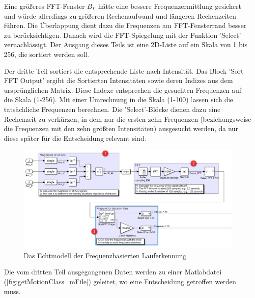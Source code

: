 Eine größeres FFT-Fenster $B_L$ hätte eine bessere Frequenzermittlung gesichert und würde allerdings zu größeren Rechenaufwand und längeren Rechenzeiten führen. Die Überlappung dient dazu die Frequenzen am FFT-Fensterrand besser zu berücksichtigen. Danach wird die FFT-Spiegelung mit der Funktion 'Select' vernachlässigt. Der Ausgang dieses Teils ist eine 2D-Liste auf ein Skala von 1 bis 256, die sortiert werden soll.

Der dritte Teil sortiert die entsprechende Liste nach Intensität. Das Block 'Sort FFT Output' ergibt die Sortierten Intensitäten sowie deren Indizes aus dem ursprünglichen Matrix. Diese Indexe entsprechen die gesuchten Frequenzen auf die Skala (1-256). Mit einer Umrechnung in die Skala (1-100) lassen sich die tatsächliche Frequenzen berechnen. Die 'Select'-Blöcke dienen dazu eine Rechenzeit zu verkürzen, in dem nur die ersten zehn Frequenzen (beziehungsweise die Frequenzen mit den zehn größten Intensitäten) ausgesucht werden, da nur diese später für die Entscheidung relevant sind.

\begin{figure}[H]
	\centering
	\includegraphics[width=\linewidth]{Bilder/Lauferkennung_Modell_1_1.png}
	\caption{Das Echtmodell der Frequenzbasierten Lauferkennung}
	\label{fig:Lauferkennung_Freqbasiert_FFT_Echtmodell}
\end{figure}

Die vom dritten Teil ausgegangenen Daten werden zu einer Matlabdatei (\autoref{fig:getMotionClass_mFile}) geleitet, wo eine Entscheidung getroffen werden muss.
%
%
%


